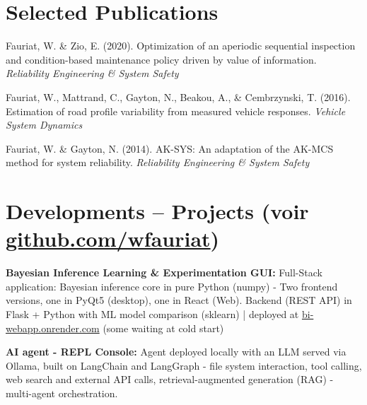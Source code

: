 \documentclass[10pt,a4paper]{article}
\begin{document}
\section*{Selected Publications}

\small
Fauriat, W. \& Zio, E. (2020). Optimization of an aperiodic sequential inspection and condition-based maintenance policy driven by value of information. \textit{Reliability Engineering \& System Safety}

Fauriat, W., Mattrand, C., Gayton, N., Beakou, A., \& Cembrzynski, T. (2016). Estimation of road profile variability from measured vehicle responses. \textit{Vehicle System Dynamics}

Fauriat, W. \& Gayton, N. (2014). AK-SYS: An adaptation of the AK-MCS method for system reliability. \textit{Reliability Engineering \& System Safety}

\section*{Developments -- Projects (voir \href{https://github.com/wfauriat}{github.com/wfauriat})}

\textbf{Bayesian Inference Learning \& Experimentation GUI:} Full-Stack application: Bayesian inference core in pure Python (numpy) - Two frontend versions,
 one in PyQt5 (desktop), one in React (Web). Backend (REST API) in Flask + Python with ML model comparison (sklearn)
  | deployed at \href{https://bi-webapp.onrender.com}{bi-webapp.onrender.com} (some waiting at cold start)

\textbf{AI agent - REPL Console:} Agent deployed locally with an LLM served via Ollama, built on LangChain and LangGraph - file system interaction, tool calling,
 web search and external API calls, retrieval-augmented generation (RAG) - multi-agent orchestration.

\end{document}

